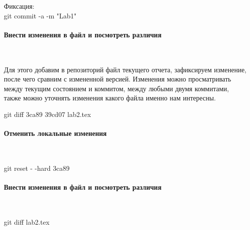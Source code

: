 \documentclass{article}
\begin{document}
Фиксация: \\
git commit -a -m "Lab1" \\

\paragraph{Внести изменения в файл и посмотреть различия}
~

Для этого добавим в репозиторий файл текущего отчета, зафиксируем изменение, после чего сравним с измененной версией. Изменения можно просматривать между текущим состоянием и коммитом, между любыми двумя коммитами, также можно уточнять изменения какого файла именно нам интересны.

git diff 3ca89 39cd07 lab2.tex

\paragraph{Отменить локальные изменения}
~

git reset - -hard 3ca89

\paragraph{Внести изменения в файл и посмотреть различия}
~

git diff lab2.tex
\end{document}
